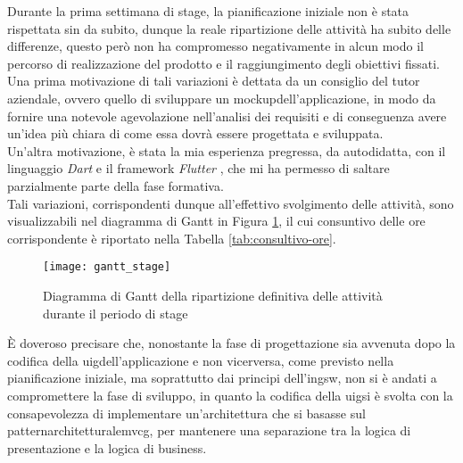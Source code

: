 Durante la prima settimana di stage, la pianificazione iniziale non è stata rispettata sin da subito, dunque la reale ripartizione delle attività ha subito delle differenze, questo però non ha compromesso negativamente in alcun modo il percorso di realizzazione del prodotto e il raggiungimento degli obiettivi fissati.\\
Una prima motivazione di tali variazioni è dettata da un consiglio del tutor aziendale, ovvero quello di sviluppare un \gls{mockup}\glsoccur dell'applicazione, in modo da fornire una notevole agevolazione nell'analisi dei requisiti e di conseguenza avere un'idea più chiara di come essa dovrà essere progettata e sviluppata.\\
Un'altra motivazione, è stata la mia esperienza pregressa, da autodidatta, con il linguaggio \emph{Dart} \cite{site:dart} e il framework \emph{Flutter} \cite{site:flutter}, che mi ha permesso di saltare parzialmente parte della fase formativa.\\
Tali variazioni, corrispondenti dunque all'effettivo svolgimento delle attività, sono visualizzabili nel diagramma di Gantt in Figura \ref{fig:gantt}, il cui consuntivo delle ore corrispondente è riportato nella Tabella \ref{tab:consultivo-ore}.

\begin{figure}[!h] 
    \centering 
    \texttt{[image: gantt\_stage]} 
    \caption{Diagramma di Gantt della ripartizione definitiva delle attività durante il periodo di stage}
    \label{fig:gantt}
\end{figure}

È doveroso precisare che, nonostante la fase di progettazione sia avvenuta dopo la codifica della \gls{uig}\glsoccur dell'applicazione e non vicerversa, come previsto nella pianificazione iniziale, ma soprattutto dai principi dell'\gls{ingsw}\glsoccur, non si è andati a compromettere la fase di sviluppo, in quanto la codifica della \gls{uig}\glsoccur si è svolta con la consapevolezza di implementare un'architettura che si basasse sul \gls{patternarchitetturale}\glsoccur \Gls{mvcg}\glsoccur, per mantenere una separazione tra la logica di presentazione e la logica di business.\\

